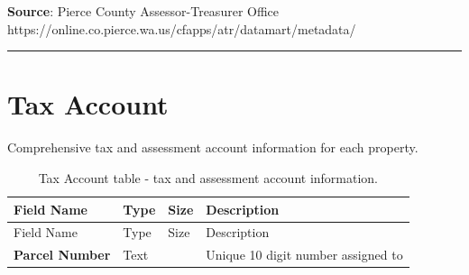 \documentclass[
  english,
  letterpaper,
  DIV=11,
  numbers=noendperiod]{scrreprt}
\begin{document}
\textbf{Source}: Pierce County Assessor-Treasurer Office
https://online.co.pierce.wa.us/cfapps/atr/datamart/metadata/

\begin{center}\rule{0.5\linewidth}{0.5pt}\end{center}

\section{Tax Account}\label{tax-account-1}

Comprehensive tax and assessment account information for each property.

\begin{longtable}[]{@{}
  >{\raggedright\arraybackslash}p{}
  >{\raggedright\arraybackslash}p{}
  >{\raggedright\arraybackslash}p{}
  >{\raggedright\arraybackslash}p{}@{}}
\caption{Tax Account table - tax and assessment account
information.}\label{tbl-app-tax-account}\tabularnewline
\toprule\noalign{}
\begin{minipage}[b]{\linewidth}\raggedright
Field Name
\end{minipage} & \begin{minipage}[b]{\linewidth}\raggedright
Type
\end{minipage} & \begin{minipage}[b]{\linewidth}\raggedright
Size
\end{minipage} & \begin{minipage}[b]{\linewidth}\raggedright
Description
\end{minipage} \\
\midrule\noalign{}
\endfirsthead
\toprule\noalign{}
\begin{minipage}[b]{\linewidth}\raggedright
Field Name
\end{minipage} & \begin{minipage}[b]{\linewidth}\raggedright
Type
\end{minipage} & \begin{minipage}[b]{\linewidth}\raggedright
Size
\end{minipage} & \begin{minipage}[b]{\linewidth}\raggedright
Description
\end{minipage} \\
\midrule\noalign{}
\endhead
\bottomrule\noalign{}
\endlastfoot
\textbf{Parcel Number} & Text & 10 & Unique 10 digit number assigned to

\end{longtable}
\end{document}
